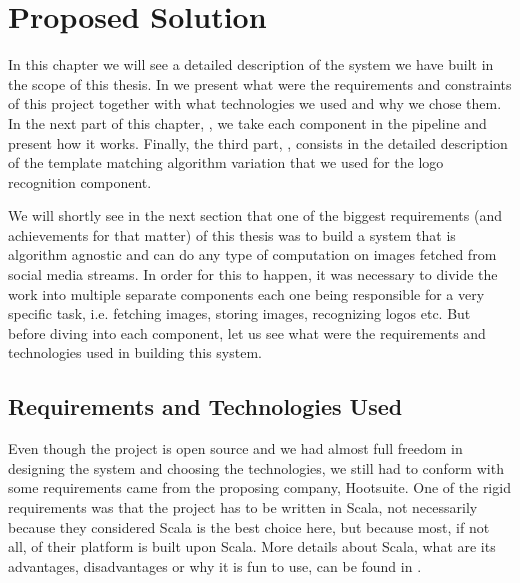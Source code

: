 \chapter{Proposed Solution}
\label{chapter:proposed-sol}

In this chapter we will see a detailed description of the system we have built
in the scope of this thesis. In  we
present what were the requirements and constraints of this project together
with what technologies we used and why we chose them. In the next part of this
chapter, , we take each component in the
pipeline and present how it works. Finally, the third part,
, consists in the detailed description of
the template matching algorithm variation that we used for the logo
recognition component.

We will shortly see in the next section that one of the biggest requirements
(and achievements for that matter) of this thesis was to build a system that
is algorithm agnostic and can do any type of computation on images fetched
from social media streams. In order for this to happen, it was necessary to
divide the work into multiple separate components each one being responsible
for a very specific task, i.e. fetching images, storing images, recognizing
logos etc. But before diving into each component, let us see what were the
requirements and technologies used in building this system.

\section{Requirements and Technologies Used}
\label{sec:reqs-tech}

Even though the project is open source and we had almost full freedom in
designing the system and choosing the technologies, we still had to conform
with some requirements came from the proposing company, Hootsuite. One of the
rigid requirements was that the project has to be written in Scala, not
necessarily because they considered Scala is the best choice here, but because
most, if not all, of their platform is built upon Scala. More details about
Scala, what are its advantages, disadvantages or why it is fun to use, can be
found in .

